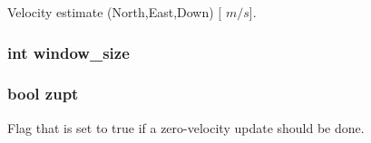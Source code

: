 \-Velocity estimate (\-North,\-East,\-Down) \mbox{[} $m/s$\mbox{]}. 

\hypertarget{group__tables_ga1c7df51cd44a9862d56e5a86a7382fe2}{
\subsubsection[{window\-\_\-size}]{\setlength{\rightskip}{0pt plus 5cm}int {\bf window\-\_\-size}}}
\label{group__tables_ga1c7df51cd44a9862d56e5a86a7382fe2}
\hypertarget{group__tables_gabd51dc1d49060099533807a22acc61d4}{
\subsubsection[{zupt}]{\setlength{\rightskip}{0pt plus 5cm}bool {\bf zupt}}}
\label{group__tables_gabd51dc1d49060099533807a22acc61d4}


\-Flag that is set to true if a zero-\/velocity update should be done. 

